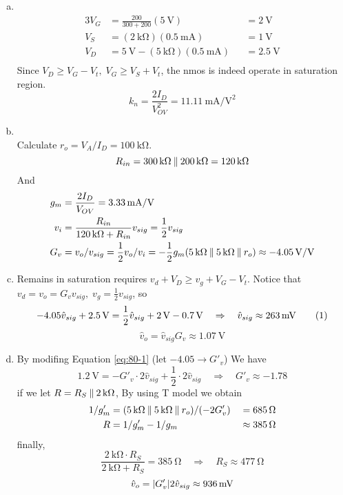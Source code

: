 \documentclass[12pt, a4paper]{article}
\begin{document}
\begin{enumerate}[(a)]
  \item \Ans \\
    \begin{alignat*}{3}
      V_G &= \frac{200}{300+200} (\SI{5}{\V}) &&= \SI{2}{\V} \\
      V_S &= (\SI{2}{\kohm}) (\SI{0.5}{\mA}) &&= \SI{1}{\V} \\
      V_D &= \SI{5}{\V} - (\SI{5}{\kohm}) (\SI{0.5}{\mA}) &&= \SI{2.5}{\V} \\
    \end{alignat*}
    Since $V_D \geq V_G - V_t, \; V_G \geq V_S + V_t$, the nmos is indeed operate in saturation region.
    \[
      k_n = \frac{2 I_D}{V_{OV}^2} = \SI{11.11}{\mA\per\V\squared}
    \]
  \item \Ans \\
    Calculate $r_o = V_A / I_D = \SI{100}{\kohm}$.
    \[
      R_{in} = \SI{300}{\kohm} \paral \SI{200}{\kohm} = \SI{120}{\kohm} \]
    And
    \begin{align*}
      g_m &= \frac{2 I_D}{V_{OV}} = \SI{3.33}{\mA\per\V} \\
      v_{i} &= \frac{R_{in}}{\SI{120}{\kohm} + R_{in}} v_{sig} = \frac{1}{2} v_{sig}  \\
      G_v &= v_o / v_{sig} = \frac{1}{2} v_o / v_i = -\frac{1}{2} g_m (\SI{5}{\kohm} \paral \SI{5}{\kohm} \paral r_o) \approx \SI{-4.05}{\V\per\V} \\
    \end{align*}
  \item 
    Remains in saturation requires $v_d + V_D \geq v_g + V_G - V_{t}$. Notice that \\ $v_d = v_o = G_v v_{sig}, \; v_g = \frac{1}{2} v_{sig}$, so
    \[
      -4.05 \hat{v}_{sig} + \SI{2.5}{\V} = \frac{1}{2} \hat{v}_{sig} + \SI{2}{\V} - \SI{0.7}{\V} \quad \Rightarrow \quad 
      \hat{v}_{sig} \approx \SI{263}{\mV} \numeq \label{eq:80-1}
    \]
    \[
      \hat{v}_{o} = \hat{v}_{sig} G_v \approx \SI{1.07}{\V}
    \]
  \item 
    By modifing Equation \eqref{eq:80-1} (let $-4.05 \rightarrow G'_v$)
    We have
    \[
     \SI{1.2}{\V} = -G'_v \cdot 2\hat{v}_{sig} + \frac{1}{2} \cdot 2\hat{v}_{sig} \quad \Rightarrow \quad G'_v \approx -1.78
    \]
    if we let $R = R_S \paral \SI{2}{\kohm}$, By using T model we obtain
    \begin{alignat*}{3}
      1/g'_m &= (\SI{5}{\kohm} \paral \SI{5}{\kohm} \paral r_o)/(-2G'_v)  && = \SI{685}{\ohm} \\
      R &= 1/g'_m - 1/g_m && \approx \SI{385}{\ohm}
    \end{alignat*}
    finally,
    \[
      \frac{\SI{2}{\kohm} \cdot R_S}{\SI{2}{\kohm} + R_S } = \SI{385}{\ohm}
      \quad \Rightarrow \quad R_S \approx \SI{477}{\ohm}
    \]
    \[
      \hat{v}_o = \abs{G'_v} 2\hat{v}_{sig} \approx  \SI{936}{\mV}
    \]
    
\end{enumerate}
\end{document}
